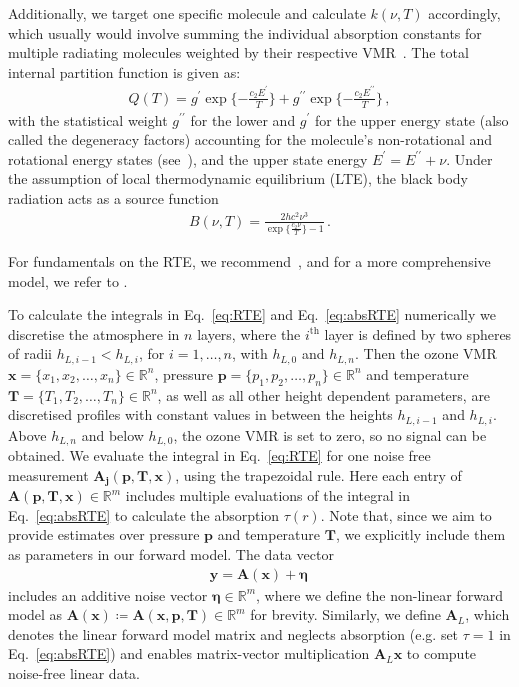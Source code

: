 Additionally, we target one specific molecule and calculate $k(\nu, T)$ accordingly, which usually would involve summing the individual absorption constants for multiple radiating molecules weighted by their respective VMR~\cite{mipas2000handbook}.
The total internal partition function is given as:
\begin{align}
	Q(T )= g^{ \prime} \exp{\{ - \frac{ c_2 E^{ \prime} }{T}\}} + g^{\prime \prime} \exp{\{ - \frac{ c_2 E^{\prime \prime} }{T}\}} \, ,
\end{align}
with the statistical weight $ g^{\prime \prime}$ for the lower and $ g^{ \prime}$ for the upper energy state (also called the degeneracy factors) accounting for the molecule's non-rotational and rotational energy states (see~\cite{vsimevckova2006einstein}), and the upper state energy $E^{ \prime} = E^{ \prime\prime} + \nu$.
Under the assumption of local thermodynamic equilibrium (LTE), the black body radiation acts as a source function
\begin{align}
	B(\nu,T)   = \frac{2 h c^2 \nu^3}{\exp{\{\frac{c_2\nu}{ T}\}}-1}\, .
\end{align}

For fundamentals on the RTE, we recommend~\cite[Chapter 1]{rybicki2000rte}, and for a more comprehensive model, we refer to \cite{read2006forwardModel}.

To calculate the integrals in Eq.~\ref{eq:RTE} and Eq.~\ref{eq:absRTE} numerically we discretise the atmosphere in $n$ layers, where the $i^\text{th}$ layer is defined by two spheres of radii $h_{L,i-1} < h_{L,i}$, for $i = 1, \dots, n$, with $h_{L,0}$ and $h_{L,n} $.
Then the ozone VMR $\bm{x} =\{x_1,x_2,\ldots,x_n\} \in \mathbb{R}^{n}$, pressure $\bm{p} =\{p_1,p_2,\ldots,p_n\} \in \mathbb{R}^{n}$ and temperature $\bm{T} =\{T_1,T_2,\ldots,T_n\} \in \mathbb{R}^{n}$, as well as all other height dependent parameters, are discretised profiles with constant values in between the heights $h_{L,i-1}$ and $h_{L,i}$.
Above $h_{L, n}$ and below $h_{L,0} $, the ozone VMR is set to zero, so no signal can be obtained.
We evaluate the integral in Eq.~\eqref{eq:RTE} for one noise free measurement $\bm{A_{j}}(\bm{p},\bm{T},\bm{x})$, using the trapezoidal rule.
Here each entry of $\bm{A}(\bm{p},\bm{T},\bm{x})\in \mathbb{R}^{m}$ includes multiple evaluations of the integral in Eq.~\ref{eq:absRTE} to calculate the absorption $\tau(r)$.
Note that, since we aim to provide estimates over pressure $\bm{p}$ and temperature $\bm{T}$, we explicitly include them as parameters in our forward model.
The data vector
\begin{align}
	\bm{y} = \bm{A}(\bm{x}) + \bm{\eta}\, 
\end{align}
includes an additive noise vector $\bm{\eta} \in \mathbb{R}^{m}$, where we define the non-linear forward model as $\bm{A}(\bm{x}) \coloneqq \bm{A}(\bm{x},  \bm{p},\bm{T})   \in \mathbb{R}^{m}$ for brevity.
Similarly, we define $\bm{A}_L$, which denotes the linear forward model matrix and neglects absorption (e.g. set $\tau = 1$ in Eq.~\eqref{eq:absRTE}) and enables matrix-vector multiplication $\bm{A}_L \bm{x}$ to compute noise-free linear data.


